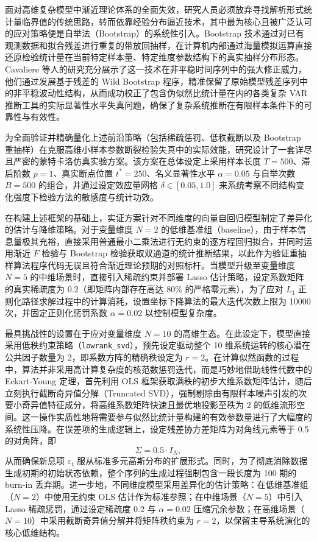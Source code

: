 面对高维复杂模型中渐近理论体系的全面失效，研究人员必须放弃寻找解析形式统计量临界值的传统思路，转而依靠经验分布逼近技术，其中最为核心且被广泛认可的应对策略便是自举法（Bootstrap）的系统性引入。Bootstrap 技术通过对已有观测数据和拟合残差进行重复的带放回抽样，在计算机内部通过海量模拟运算直接还原检验统计量在当前特定样本量、特定维度参数结构下的真实抽样分布形态。Cavaliere 等人的研究充分展示了这一技术在非平稳时间序列中的强大修正威力，他们通过发展基于残差的 Wild Bootstrap 程序，精准保留了原始模型残差序列中的非平稳波动性结构，从而成功校正了包含伪似然比统计量在内的各类复杂 VAR 推断工具的实际显著性水平失真问题，确保了复杂系统推断在有限样本条件下的可靠性与有效性。

为全面验证并精确量化上述前沿策略（包括稀疏惩罚、低秩截断以及 Bootstrap 重抽样）在克服高维小样本参数断裂检验失真中的实际效能，研究设计了一套详尽且严密的蒙特卡洛仿真实验方案。该方案在总体设定上采用样本长度 $T=500$、滞后阶数 $p=1$、真实断点位置 $t^*=250$、名义显著性水平 $\alpha=0.05$ 与自举次数 $B=500$ 的组合，并通过设定效应量网格 $\delta \in [0.05, 1.0]$ 来系统考察不同结构变化强度下检验方法的敏感度与统计功效。


在构建上述框架的基础上，实证方案针对不同维度的向量自回归模型制定了差异化的估计与降维策略。对于变量维度 $N=2$ 的低维基准组（baseline），由于样本信息量极其充裕，直接采用普通最小二乘法进行无约束的逐方程回归拟合，并同时运用渐近 $F$ 检验与 Bootstrap 检验获取双通道的统计推断结果，以此作为验证重抽样算法程序代码无误且符合渐近理论预期的对照标杆。当模型升级至变量维度 $N=5$ 的中维场景时，直接引入稀疏约束并部署 Lasso 估计策略，设定系数矩阵的真实稀疏度为 0.2（即矩阵内部存在高达 80\% 的严格零元素），为了应对 $L_1$ 正则化路径求解过程中的计算消耗，设置坐标下降算法的最大迭代次数上限为 10000 次，并固定正则化惩罚系数 $\alpha=0.02$ 以控制模型复杂度。

最具挑战性的设置在于应对变量维度 $N=10$ 的高维生态。在此设定下，模型直接采用低秩约束策略（\texttt{lowrank\_svd}），预先设定驱动整个 10 维系统运转的核心潜在公共因子数量为 2，即系数方阵的精确秩设定为 $r=2$。在计算似然函数的过程中，算法并非采用高计算复杂度的核范数惩罚迭代，而是巧妙地借助线性代数中的 Eckart-Young 定理，首先利用 OLS 框架获取满秩的初步大维系数矩阵估计，随后立刻执行截断奇异值分解（Truncated SVD），强制剔除由有限样本噪声引发的次要小奇异值特征成分，将高维系数矩阵快速且最优地投影至秩为 2 的低维流形空间。这一操作实质性地将需要参与似然比统计量构建的有效参数量进行了大幅度的系统性压降。在误差项的生成逻辑上，设定残差协方差矩阵为对角线元素等于 0.5 的对角阵，即
\begin{equation}
\Sigma = 0.5 \cdot I_N,
\end{equation}
从而确保新息项 $\varepsilon_t$ 服从标准多元高斯分布的扩展形式。同时，为了彻底消除数据生成初期的初始状态依赖，整个序列的生成过程强制包含一段长度为 100 期的 burn-in 丢弃期。进一步地，不同维度模型采用差异化的估计策略：在低维基准组（$N=2$）中使用无约束 OLS 估计作为标准参照；在中维场景（$N=5$）中引入 Lasso 稀疏惩罚，通过设定稀疏度 0.2 与 $\alpha=0.02$ 压缩冗余参数；在高维场景（$N=10$）中采用截断奇异值分解并将矩阵秩约束为 $r=2$，以保留主导系统演化的核心低维结构。


